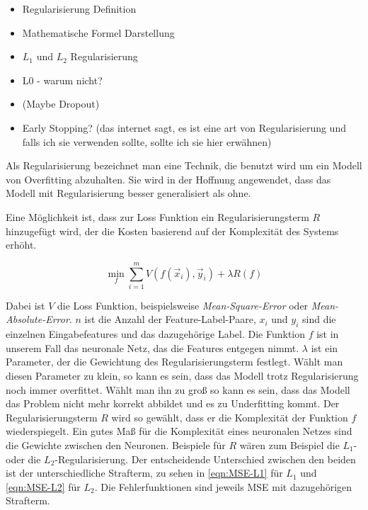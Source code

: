 \begin{itemize}
	\item Regularisierung Definition
	\item Mathematische Formel Darstellung
	\item \(L_1\) und \(L_2\) Regularisierung
	\item L0 - warum nicht?
	\item (Maybe Dropout)
	\item Early Stopping? (das internet sagt, es ist eine art von Regularisierung und falls ich sie verwenden sollte, sollte ich sie hier erwähnen)
\end{itemize}

Als Regularisierung bezeichnet man eine Technik, die benutzt wird um ein Modell von Overfitting abzuhalten.
Sie wird in der Hoffnung angewendet, dass das Modell mit Regularisierung besser generalisiert als ohne.

Eine Möglichkeit ist, dass zur Loss Funktion ein Regularisierungsterm \(R\) hinzugefügt wird, 
der die Kosten basierend auf der Komplexität des Systems erhöht.

\begin{equation}
	\min_f \sum\limits_{i=1}^{m} V(f(\vec{x}_i), \vec{y}_i) + \lambda R(f)
\end{equation} 

Dabei ist \(V\) die Loss Funktion, beispielsweise \textit{Mean-Square-Error} oder \textit{Mean-Absolute-Error}.
\(n\) ist die Anzahl der Feature-Label-Paare,
\(x_i\) und \(y_i\) sind die einzelnen Eingabefeatures und das dazugehörige Label.
Die Funktion \(f\) ist in unserem Fall das neuronale Netz, das die Features entgegen nimmt.
\(\lambda\) ist ein Parameter, der die Gewichtung des Regularisierungsterm festlegt.
Wählt man diesen Parameter zu klein, so kann es sein, dass das Modell trotz Regularisierung noch immer overfittet.
Wählt man ihn zu groß so kann es sein, dass das Modell das Problem nicht mehr korrekt abbildet und es zu Underfitting kommt.
Der Regularisierungsterm \(R\) wird so gewählt, dass er die Komplexität der Funktion \(f\) wiederspiegelt.
Ein gutes Maß für die Komplexität eines neuronalen Netzes sind die Gewichte zwischen den Neuronen.
Beispiele für \(R\) wären zum Beispiel die \(L_1\)- oder die \(L_2\)-Regularisierung. %
Der entscheidende Unterschied zwischen den beiden ist der unterschiedliche Strafterm, zu sehen in \ref{eqn:MSE-L1} für \(L_1\) und \ref{eqn:MSE-L2} für \(L_2\). 
Die Fehlerfunktionen sind jeweils MSE mit dazugehörigen Strafterm.

